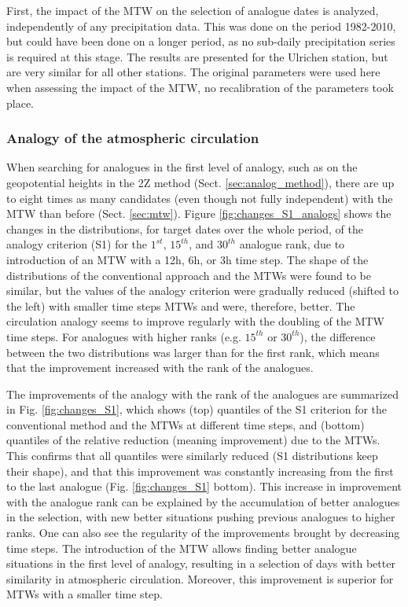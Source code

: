 \documentclass[hess, manuscript]{copernicus}
\begin{document}
	First, the impact of the MTW on the selection of analogue dates is analyzed, independently of any precipitation data. This was done on the period 1982-2010, but could have been done on a longer period, as no sub-daily precipitation series is required at this stage. The results are presented for the Ulrichen station, but are very similar for all other stations. The original parameters were used here when assessing the impact of the MTW, no recalibration of the parameters took place.
	
	\subsubsection{Analogy of the atmospheric circulation}
	\label{sec:changes_analogy_circul}
	
	When searching for analogues in the first level of analogy, such as on the geopotential heights in the 2Z method (Sect. \ref{sec:analog_method}), there are up to eight times as many candidates (even though not fully independent) with the MTW than before (Sect. \ref{sec:mtw}). Figure \ref{fig:changes_S1_analogs} shows the changes in the distributions, for target dates over the whole period, of the analogy criterion (S1) for the $1^{st}$, $15^{th}$, and $30^{th}$ analogue rank, due to introduction of an MTW with a 12h, 6h, or 3h time step. The shape of the distributions of the conventional approach and the MTWs were found to be similar, but the values of the analogy criterion were gradually reduced (shifted to the left) with smaller time steps MTWs and were, therefore, better. The circulation analogy seems to improve regularly with the doubling of the MTW time steps. For analogues with higher ranks (e.g. $15^{th}$ or $30^{th}$), the difference between the two distributions was larger than for the first rank, which means that the improvement increased with the rank of the analogues. 
	
	The improvements of the analogy with the rank of the analogues are summarized in Fig. \ref{fig:changes_S1}, which shows (top) quantiles of the S1 criterion for the conventional method and the MTWs at different time steps, and (bottom) quantiles of the relative reduction (meaning improvement) due to the MTWs. This confirms that all quantiles were similarly reduced (S1 distributions keep their shape), and that this improvement was constantly increasing from the first to the last analogue (Fig. \ref{fig:changes_S1} bottom). This increase in improvement with the analogue rank can be explained by the accumulation of better analogues in the selection, with new better situations pushing previous analogues to higher ranks. One can also see the regularity of the improvements brought by decreasing time steps. The introduction of the MTW allows finding better analogue situations in the first level of analogy, resulting in a selection of days with better similarity in atmospheric circulation. Moreover, this improvement is superior for MTWs with a smaller time step.
	
\end{document}

